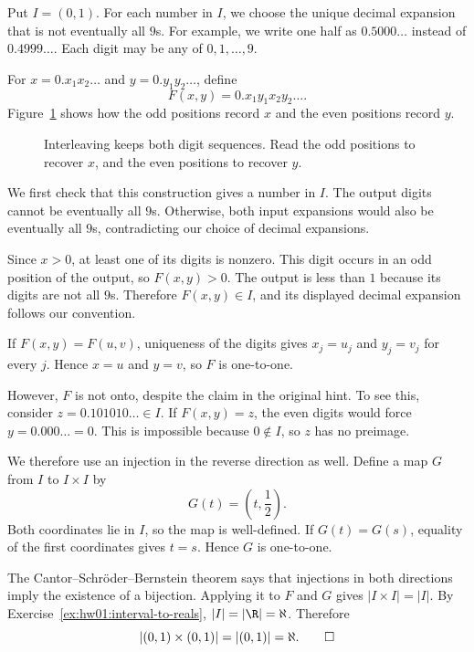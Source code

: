 Put $I=(0,1)$. For each number in $I$, we choose the unique
decimal expansion that is not eventually all $9$s.
For example, we write one half as $0.5000\ldots$ instead of
$0.4999\ldots$. Each digit may be any of $0,1,\ldots,9$.

For $x=0.x_1x_2\ldots$ and $y=0.y_1y_2\ldots$, define
\[
  F(x,y)=0.x_1y_1x_2y_2\ldots.
\]
Figure~\ref{fig:hw01:decimal-interleaving} shows how the odd
positions record $x$ and the even positions record $y$.

\begin{figure}[h]
  \centering
  
  \caption{Interleaving keeps both digit sequences. Read the odd
    positions to recover $x$, and the even positions to recover $y$.}
  \label{fig:hw01:decimal-interleaving}
\end{figure}

\clearpage

We first check that this construction gives a number in $I$.
The output digits cannot be eventually all $9$s. Otherwise,
both input expansions would also be eventually all $9$s,
contradicting our choice of decimal expansions.

Since $x>0$, at least one of its digits is nonzero. This digit
occurs in an odd position of the output, so $F(x,y)>0$.
The output is less than $1$ because its digits are not all $9$s.
Therefore $F(x,y)\in I$, and its displayed decimal expansion
follows our convention.

If $F(x,y)=F(u,v)$, uniqueness of the digits gives $x_j=u_j$
and $y_j=v_j$ for every $j$. Hence $x=u$ and $y=v$, so $F$
is one-to-one.

However, $F$ is not onto, despite the claim in the original hint.
To see this, consider $z=0.101010\ldots\in I$.
If $F(x,y)=z$, the even digits would force $y=0.000\ldots=0$.
This is impossible because $0\notin I$, so $z$ has no preimage.

We therefore use an injection in the reverse direction as well.
Define a map $G$ from $I$ to $I\times I$ by
\[
  G(t)=\left(t,\frac12\right).
\]
Both coordinates lie in $I$, so the map is well-defined.
If $G(t)=G(s)$, equality of the first coordinates gives $t=s$.
Hence $G$ is one-to-one.

The Cantor--Schr\"oder--Bernstein theorem says that injections
in both directions imply the existence of a bijection.
Applying it to $F$ and $G$ gives $|I\times I|=|I|$.
By Exercise~\ref{ex:hw01:interval-to-reals}, $|I|=|\R|=\aleph$.
Therefore
\[
  |(0,1)\times(0,1)|=|(0,1)|=\aleph.\qedhere
\]

